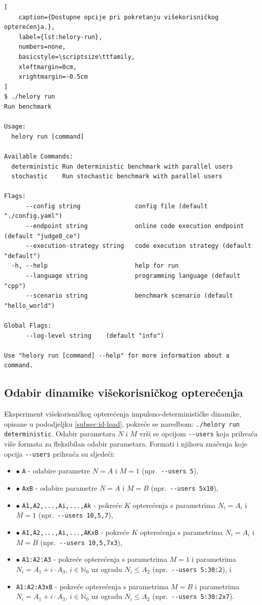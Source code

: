 \documentclass[times, utf8, diplomski]{fer}
\begin{document}
\begin{lstlisting}[
    caption={Dostupne opcije pri pokretanju višekorisničkog opterećenja.},
    label={lst:helory-run},
    numbers=none,
    basicstyle=\scriptsize\ttfamily,
    xleftmargin=0cm,
    xrightmargin=-0.5cm
]
$ ./helory run
Run benchmark

Usage:
  helory run [command]

Available Commands:
  deterministic Run deterministic benchmark with parallel users
  stochastic    Run stochastic benchmark with parallel users

Flags:
      --config string               config file (default "./config.yaml")
      --endpoint string             online code execution endpoint (default "judge0_ce")
      --execution-strategy string   code execution strategy (default "default")
  -h, --help                        help for run
      --language string             programming language (default "cpp")
      --scenario string             benchmark scenario (default "hello_world")

Global Flags:
      --log-level string    (default "info")

Use "helory run [command] --help" for more information about a command.
\end{lstlisting}

\subsection{Odabir dinamike višekorisničkog opterećenja}
Eksperiment višekorisničkog opterećenja impulsno-determinističke dinamike, opisane u pododjeljku \ref{subsec:id-load}, pokreće se naredbom: \lstinline{./helory run deterministic}. Odabir parametara $N$ i $M$ vrši se opcijom \lstinline{--users} koja prihvaća više formata za fleksibilan odabir parametara. Formati i njihova značenja koje opcija \lstinline{--users} prihvaća su sljedeći:
\begin{itemize}
    \item[$\bullet$] \lstinline{A} - odabire parametre $N = A$ i $M = 1$ (npr.\ \lstinline{--users 5}),
    \item[$\bullet$] \lstinline{AxB} - odabire parametre $N = A$ i $M = B$ (npr.\ \lstinline{--users 5x10}),
    \item[$\bullet$] \lstinline{A1,A2,...,Ai,...,Ak} - pokreće $K$ opterećenja s parametrima $N_i=A_i$ i $M=1$ (npr.\ \lstinline{--users 10,5,7}),
    \item[$\bullet$] \lstinline{A1,A2,...,Ai,...,AKxB} - pokreće $K$ opterećenja s parametrima $N_i=A_i$ i $M=B$ (npr.\ \lstinline{--users 10,5,7x3}),
    \item[$\bullet$] \lstinline{A1:A2:A3} - pokreće opterećenja s parametrima $M = 1$ i parametrima $N_i=A_1 + i \cdot A_3$, $i \in \mathbb{N}_0$ uz ogradu $N_i \leq A_2$ (npr.\ \lstinline{--users 5:30:2}), i
    \item[$\bullet$] \lstinline{A1:A2:A3xB} - pokreće opterećenja s parametrima $M = B$ i parametrima $N_i=A_1 + i \cdot A_3$, $i \in \mathbb{N}_0$ uz ogradu $N_i \leq A_2$ (npr.\ \lstinline{--users 5:30:2x7}).
\end{itemize}
\end{document}
